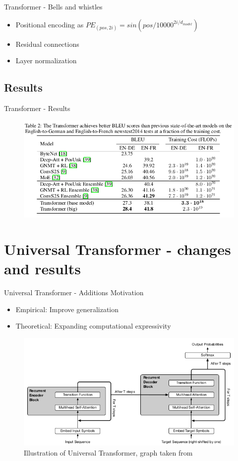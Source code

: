 \documentclass{beamer}
\begin{document}
\begin{frame}{Transformer - Bells and whistles}
	\begin{itemize}
		\item Positional encoding as $PE_{(pos,2i)} = sin(pos / 10000^{2i/d_{model}})$
		\item Residual connections
		\item Layer normalization
	\end{itemize}
\end{frame}

\subsection{Results}

\begin{frame}{Transformer - Results}
\begin{figure}[t]
	\includegraphics[width=\textwidth]{figures/trans-results.png}
\end{figure}
\end{frame}

\section{Universal Transformer - changes and results}
\begin{frame}{Universal Transformer - Additions}
Motivation
	\begin{itemize}
		\item Empirical: Improve generalization
		\item Theoretical: Expanding computational expressivity
	\end{itemize}
	\begin{figure}[t]
		\includegraphics[width=\textwidth]{figures/universal-trans.png}
		\caption{Illustration of Universal Transformer, graph taken from \cite{dehghani_universal_2018}}
	\end{figure}
\end{frame}
\end{document}
